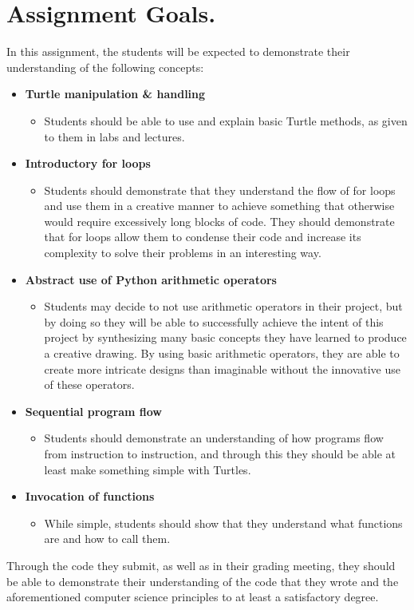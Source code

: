 \documentclass[11pt, letterpaper, onecolumn, oneside, final]{article}
\begin{document}
    \maketitle


\section{Assignment Goals.} 

In this assignment, the students will be expected to demonstrate their understanding of the following concepts:
\begin{itemize}
\item \textbf{Turtle manipulation \& handling}
\begin{itemize}
\item Students should be able to use and explain basic Turtle methods, as given to them in labs and lectures.
\end{itemize}
\item \textbf{Introductory for loops}
\begin{itemize}
\item Students should demonstrate that they understand the flow of for loops and use them in a creative manner to achieve something that otherwise would require excessively long blocks of code. They should demonstrate that for loops allow them to condense their code and increase its complexity to solve their problems in an interesting way.
\end{itemize}
\item \textbf{Abstract use of Python arithmetic operators}
\begin{itemize}
\item Students may decide to not use arithmetic operators in their project, but by doing so
they will be able to successfully achieve the intent of this project by synthesizing many
basic concepts they have learned to produce a creative drawing. By using basic
arithmetic operators, they are able to create more intricate designs than imaginable
without the innovative use of these operators.
\end{itemize}
\item \textbf{Sequential program flow}
\begin{itemize}
\item Students should demonstrate an understanding of how programs flow from instruction to instruction, and through this they should be able at least make something simple with Turtles.
\end{itemize}
\item \textbf{Invocation of functions}
\begin{itemize}
\item While simple, students should show that they understand what functions are and how to call them.
\end{itemize}
\end{itemize}
Through the code they submit, as well as in their grading meeting, they should be able to demonstrate their understanding of the code that they wrote and the aforementioned computer science principles to at least a satisfactory degree.
\end{document}
